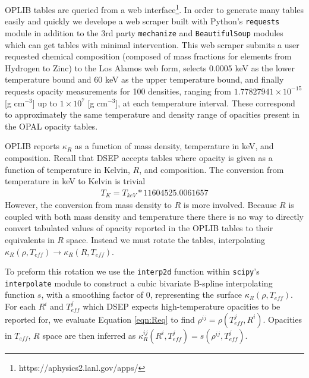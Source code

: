 OPLIB tables are queried from a web
interface\footnote{https://aphysics2.lanl.gov/apps/}. In order to generate many
tables easily and quickly we develope a web scraper built with Python's
\texttt{requests} module in addition to the 3rd party \texttt{mechanize} and
\texttt{BeautifulSoup} modules \citep{chandra2015python,
richardson2007beautiful} which can get tables with minimal intervention. This
web scraper submits a user requested chemical composition (composed of mass
fractions for elements from Hydrogen to Zinc) to the Los Alamos web form,
selects 0.0005 keV as the lower temperature bound and 60 keV as the upper
temperature bound, and finally requests opacity measurements for 100 densities,
ranging from $1.77827941\times 10 ^{-15}$ [g cm$^{-3}$] up to $1\times10^{7}$
[g cm$^{-3}$], at each temperature interval. These correspond to approximately
the same temperature and density range of opacities present in the OPAL opacity
tables.

OPLIB reports $\kappa_{R}$ as a function of mass density, temperature in keV,
and composition. Recall that DSEP accepts tables where opacity is given as a
function of temperature in Kelvin, $R$, and composition. The conversion from
temperature in keV to Kelvin is trivial
\begin{align}
	T_{K} = T_{keV} * 11604525.0061657
\end{align}
However, the conversion from mass density to $R$ is more involved. Because $R$ is
coupled with both mass density and temperature there there is no way to
directly convert tabulated values of opacity reported in the OPLIB tables to
their equivalents in $R$ space. Instead we must rotate the tables,
interpolating $\kappa_{R}(\rho,T_{eff}) \rightarrow \kappa_{R}(R,T_{eff})$. 

To preform this rotation we use the \texttt{interp2d} function within
\texttt{scipy}'s \texttt{interpolate} \citep{2020SciPy-NMeth} module to
construct a cubic bivariate B-spline \citep{Dierckx1981} interpolating function
$s$, with a smoothing factor of 0, representing the surface $\kappa_{R}(\rho,
T_{eff})$. For each $R^{i}$ and $T^{j}_{eff}$ which DSEP expects
high-temperature opacities to be reported for, we evaluate Equation
\ref{eqn:Req} to find $\rho^{ij} = \rho(T^{j}_{eff},R^{i})$.  Opacities in
$T_{eff}$, $R$ space are then inferred as $\kappa^{ij}_{R}(R^{i},T^{j}_{eff}) =
s(\rho^{ij}, T^{j}_{eff})$. 

